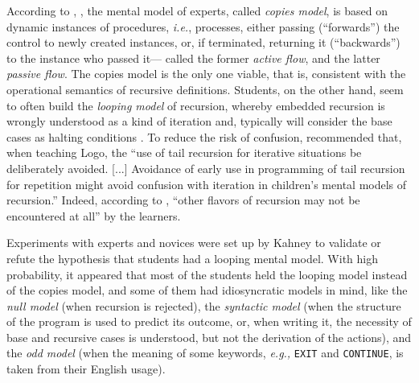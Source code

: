 \documentclass[11pt,a4paper]{article}
\newcommand\plang[1]{\textsf{#1}\xspace}
\newcommand\exc[1]{\texttt{\small #1}}
\begin{document}
According to \textcite{Kahney:1983}, \textcite{KahneyEisenstadt:1982},
the mental model of experts, called \emph{copies model}, is based on
dynamic instances of procedures, \emph{i.e.}, processes, either
passing (``forwards'') the control to newly created instances, or, if
terminated, returning it (``backwards'') to the instance who passed
it---\textcite{George:2000a} called the former \emph{active flow}, and
the latter \emph{passive flow}. The copies model is the only one
viable, that is, consistent with the operational semantics of
recursive definitions. Students, on the other hand, seem to often
build the \emph{looping model} of recursion, whereby embedded
recursion is wrongly understood as a kind of iteration and, typically
will consider the base cases as halting conditions
\citep{HabermanAverbuch:2002}. To reduce the risk of confusion,
\textcite{McDougall:1985} recommended that, when teaching
\plang{Logo}, the ``use of tail recursion for iterative situations be
deliberately avoided. [...] Avoidance of early use in programming of
tail recursion for repetition might avoid confusion with iteration in
children's mental models of recursion.'' Indeed, according to
\textcite{Tempel:1985}, ``other flavors of recursion may not be
encountered at all'' by the learners.

Experiments with experts and novices were set up by Kahney to validate
or refute the hypothesis that students had a looping mental
model. With high probability, it appeared that most of the students
held the looping model instead of the copies model, and some of them
had idiosyncratic models in mind, like the \emph{null model} (when
recursion is rejected), the \emph{syntactic model} (when the structure
of the program is used to predict its outcome, or, when writing it,
the necessity of base and recursive cases is understood, but not the
derivation of the actions), and the \emph{odd model} (when the meaning
of some keywords, \emph{e.g.,} \exc{EXIT} and \exc{CONTINUE}, is taken
from their English usage).
\end{document}

